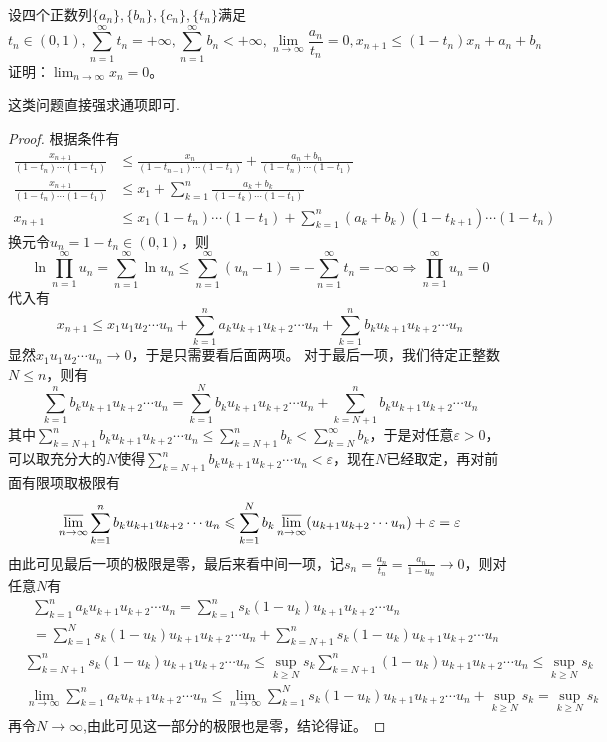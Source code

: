 \documentclass[../../main.tex]{subfiles}
\begin{document}
\begin{example}
设四个正数列\(\{a_n\},\{b_n\},\{c_n\},\{t_n\}\)满足
\[t_n\in(0,1),\sum_{n = 1}^{\infty}t_n=+\infty,\sum_{n = 1}^{\infty}b_n<+\infty,\lim_{n\rightarrow\infty}\frac{a_n}{t_n}=0,x_{n + 1}\leqslant (1 - t_n)x_n+a_n + b_n\]
证明：\(\lim_{n\rightarrow\infty}x_n = 0\)。
\end{example}
\begin{note}
这类问题直接强求通项即可.
\end{note}
\begin{proof}
根据条件有
\begin{align*}
\frac{x_{n + 1}}{(1 - t_n)\cdots(1 - t_1)}&\leqslant \frac{x_n}{(1 - t_{n-1})\cdots(1 - t_1)}+\frac{a_n + b_n}{(1 - t_n)\cdots(1 - t_1)}\\
\frac{x_{n + 1}}{(1 - t_n)\cdots(1 - t_1)}&\leqslant  x_1+\sum_{k = 1}^{n}\frac{a_k + b_k}{(1 - t_k)\cdots(1 - t_1)}\\
x_{n + 1}&\leqslant  x_1(1 - t_n)\cdots(1 - t_1)+\sum_{k = 1}^{n}(a_k + b_k)(1 - t_{k + 1})\cdots(1 - t_n)
\end{align*}
换元令\(u_n = 1 - t_n\in(0,1)\)，则
\[\ln\prod_{n = 1}^{\infty}u_n=\sum_{n = 1}^{\infty}\ln u_n\leqslant \sum_{n = 1}^{\infty}(u_n - 1)=-\sum_{n = 1}^{\infty}t_n=-\infty\Rightarrow\prod_{n = 1}^{\infty}u_n = 0\]
代入有
\[x_{n + 1}\leqslant  x_1u_1u_2\cdots u_n+\sum_{k = 1}^{n}a_ku_{k + 1}u_{k + 2}\cdots u_n+\sum_{k = 1}^{n}b_ku_{k + 1}u_{k + 2}\cdots u_n\]
显然\(x_1u_1u_2\cdots u_n\rightarrow0\)，于是只需要看后面两项。
对于最后一项，我们待定正整数\(N\leqslant  n\)，则有
\[\sum_{k = 1}^{n}b_ku_{k + 1}u_{k + 2}\cdots u_n=\sum_{k = 1}^{N}b_ku_{k + 1}u_{k + 2}\cdots u_n+\sum_{k = N + 1}^{n}b_ku_{k + 1}u_{k + 2}\cdots u_n\]
其中\(\sum_{k = N + 1}^{n}b_ku_{k + 1}u_{k + 2}\cdots u_n\leqslant \sum_{k = N + 1}^{n}b_k<\sum_{k = N}^{\infty}b_k\)，于是对任意\(\varepsilon>0\)，可以取充分大的\(N\)使得\(\sum_{k = N + 1}^{n}b_ku_{k + 1}u_{k + 2}\cdots u_n<\varepsilon\)，现在\(N\)已经取定，再对前面有限项取极限有
\[\varlimsup_{n\rightarrow\infty}\sum_{k = 1}^{n}b_ku_{k + 1}u_{k + 2}\cdots u_n\leqslant \sum_{k = 1}^{N}b_k\varlimsup_{n\rightarrow\infty}(u_{k + 1}u_{k + 2}\cdots u_n)+\varepsilon=\varepsilon\]
由此可见最后一项的极限是零，最后来看中间一项，记\(s_n=\frac{a_n}{t_n}=\frac{a_n}{1 - u_n}\rightarrow0\)，则对任意\(N\)有
\begin{align*}
&\sum_{k = 1}^{n}a_ku_{k + 1}u_{k + 2}\cdots u_n=\sum_{k = 1}^{n}s_k(1 - u_k)u_{k + 1}u_{k + 2}\cdots u_n\\
&=\sum_{k = 1}^{N}s_k(1 - u_k)u_{k + 1}u_{k + 2}\cdots u_n+\sum_{k = N + 1}^{n}s_k(1 - u_k)u_{k + 1}u_{k + 2}\cdots u_n
\end{align*}
\begin{align*}
&\sum_{k = N + 1}^{n}s_k(1 - u_k)u_{k + 1}u_{k + 2}\cdots u_n\leqslant \sup_{k\geqslant  N}s_k\sum_{k = N + 1}^{n}(1 - u_k)u_{k + 1}u_{k + 2}\cdots u_n\leqslant \sup_{k\geqslant  N}s_k\\
&\lim_{n\rightarrow\infty}\sum_{k = 1}^{n}a_ku_{k + 1}u_{k + 2}\cdots u_n\leqslant \lim_{n\rightarrow\infty}\sum_{k = 1}^{N}s_k(1 - u_k)u_{k + 1}u_{k + 2}\cdots u_n+\sup_{k\geqslant  N}s_k=\sup_{k\geqslant  N}s_k
\end{align*}
再令$N\to \infty$,由此可见这一部分的极限也是零，结论得证。
\end{proof}
\end{document}
